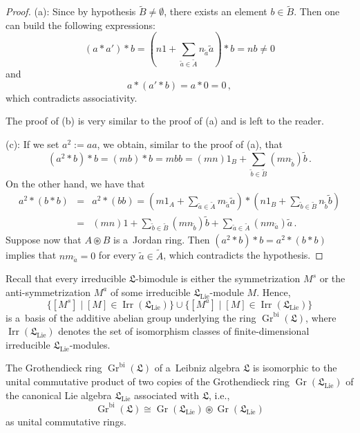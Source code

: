 \documentclass{jonasart}
\DeclareMathOperator{\bi}{bi}
\DeclareMathOperator{\irr}{Irr}
\DeclareMathOperator{\K}{Gr}
\DeclareMathOperator{\lie}{Lie}
\newcommand{\lf}{\mathfrak{L}}
\begin{document}
	\begin{proof}
		(a): Since by hypothesis $\widetilde{B}\ne\emptyset$, there exists an element
		$b\in\widetilde{B}$. Then one can build the following expressions:
		\[
			(a*a')*b=\left(n1+\sum_{\tilde{a}\in\widetilde{A}}n_{\tilde{a}}\tilde{a}
			\right)*b=nb\ne 0
		\]
		and
		\[
			a*(a'*b)=a*0=0\,,
		\]
		which contradicts associativity.

		The proof of (b) is very similar to the proof of (a) and is left to the reader.

		(c): If we set $a^2:=aa$, we obtain, similar to the proof of (a), that
		\[
			(a^2 *b)*b=(mb)*b=mbb=(mn)1_B +\sum_{\tilde{b}\in\widetilde{B}}
			(mn_{\tilde{b}})\tilde{b}\,.
		\]
		On the other hand, we have that
		\begin{eqnarray*}
			a^2 *(b*b) & = & a^2 *(bb)=\left(m1_A +\sum_{\tilde{a}\in\widetilde{A}}
			m_{\tilde{a}}\tilde{a}\right)*\left(n1_B +\sum_{\tilde{b}\in\widetilde{B}}
			n_{\tilde{b}}\tilde{b}\right)\\
			& = & (mn)1+\sum_{\tilde{b}\in\widetilde{B}}(mn_{\tilde{b}})\tilde{b}
			+\sum_{\tilde{a}\in\widetilde{A}}(nm_{\tilde{a}})\tilde{a}\,.
		\end{eqnarray*}
		Suppose now that $A\circledast B$ is a~Jordan ring. Then $(a^2 *b)*b=
		a^2 *(b*b)$ implies that $nm_{\tilde{a}}=0$ for every $\tilde{a}\in
		\widetilde{A}$, which contradicts the hypothesis.
	\end{proof}

	Recall that every irreducible $\lf$-bimodule is either the symmetrization $M^s$
	or the anti-symmetrization $M^a$ of some irreducible $\lf_{\lie}$-module $M$. Hence,
	\[
		\{[M^s ]\mid[M]\in\irr(\lf_{\lie})\}\cup\{[M^a ]\mid[M]\in\irr(\lf_{\lie})\}
	\]
	is a~basis of the additive abelian group underlying the ring $\K^{\bi}(\lf)$, where $\irr(\lf_{\lie})$ denotes the set of isomorphism classes of finite-dimensional irreducible $\lf_{\lie}$-modules.
	\begin{theorem}\label{communitalprod}
		The Grothendieck ring $\K^{\bi}(\lf)$ of a~Leibniz algebra $\lf$ is isomorphic to the unital commutative product of two copies of the Grothendieck ring $\K
		(\lf_{\lie})$ of the canonical Lie algebra $\lf_{\lie}$ associated with $\lf$, i.e.,
		\[
			\K^{\bi}(\lf)\cong\K(\lf_{\lie})\circledast\K(\lf_{\lie})
		\]
		as unital commutative rings.
	\end{theorem}
\end{document}
